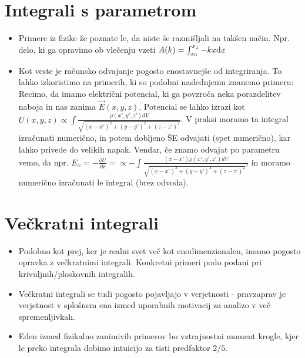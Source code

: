 \documentclass[12pt]{article}
\begin{document}
\section*{Integrali s parametrom}
\begin{itemize}[leftmargin=1.5em]
    \item Primere iz fizike že poznate le, da niste še razmišljali na takšen način. Npr. delo, ki ga opravimo ob vlečenju vzeti $A(k) = \int_{x_0}^{x_1} -k x \textup{d}x$
    \item Kot veste je računsko odvajanje pogosto enostavnejše od integriranja. To lahko izkoristimo na primerih, ki so podobni naslednjemu znanemo primeru: Recimo, da imamo električni potencial, ki ga povzroča neka porazdelitev naboja in nas zanima $\vec{E}(x,y,z)$. Potencial se lahko izrazi kot $U(x,y,z) \propto \int \frac{\rho(x',y',z') dV}{\sqrt{(x-x')^2+(y-y')^2+(z-z')^2}}$. V praksi moramo ta integral izračunati numerično, in potem dobljeno ŠE odvajati (spet numerično), kar lahko privede do velikih napak. Vendar, če znamo odvajat po parametru vemo, da npr.  $E_x = - \frac{\partial U}{\partial x} =  \propto -\int \frac{(x-x') \rho(x',y',z') dV}{\sqrt{(x-x')^2+(y-y')^2+(z-z')^2}^3}$ in moramo numerično izračunati le integral (brez odvoda).
\end{itemize}


\section*{Večkratni integrali}
\begin{itemize}[leftmargin=1.5em]
    \item Podobno kot prej, ker je realni svet več kot enodimenzionalen, imamo pogosto opravka z večkratnimi integrali. Konkretni primeri podo podani pri krivuljnih/ploskovnih integralih.
    \item Večkratni integrali se tudi pogosto pojavljajo v verjetnosti - pravzaprav je verjetnost v splošnem ena izmed uporabnih motivacij za analizo v več spremenljivkah.
    \item Eden izmed fizikalno zanimivih primerov bo vztrajnostni moment krogle, kjer le preko integrala dobimo intuicijo za tisti predfaktor $2/5$.
\end{itemize}
\end{document}
